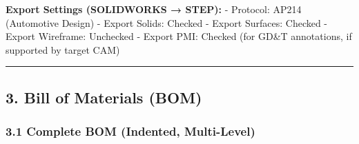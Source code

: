\documentclass[
]{article}
\begin{document}
\textbf{Export Settings (SOLIDWORKS → STEP):} - Protocol: AP214
(Automotive Design) - Export Solids: Checked - Export Surfaces: Checked
- Export Wireframe: Unchecked - Export PMI: Checked (for GD\&T
annotations, if supported by target CAM)

\begin{center}\rule{0.5\linewidth}{0.5pt}\end{center}

\hypertarget{bill-of-materials-bom}{%
\subsection{3. Bill of Materials (BOM)}\label{bill-of-materials-bom}}

\hypertarget{complete-bom-indented-multi-level}{%
\subsubsection{3.1 Complete BOM (Indented,
Multi-Level)}\label{complete-bom-indented-multi-level}}
\end{document}
